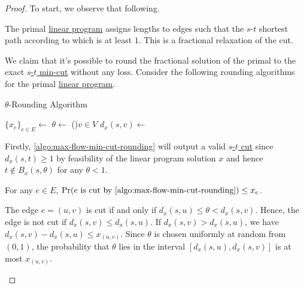 \begin{proof}
	To start, we observe that following.
	\begin{intuition}
		The primal \hyperref[eq:s-t-min-cut-LP]{linear program} assigns lengths to edges such that the \(s\)-\(t\) shortest path according to which is at least \(1\). This is a fractional relaxation of the cut.
	\end{intuition}

	We claim that it's possible to round the fractional solution of the primal to the exact \hyperref[prb:s-t-min-cut]{\(s\)-\(t\) min-cut} without any loss. Consider the following rounding algorithms for the primal \hyperref[eq:s-t-min-cut-LP]{linear program}.

	\begin{algorithm}[H]\label{algo:max-flow-min-cut-rounding}
		\DontPrintSemicolon{}
		\caption{\(\theta \)-Rounding Algorithm}

		\BlankLine

		\(\{ x_e \} _{e\in E} \gets\)
		\(\theta \gets\)\;
		\For(){\(v \in V\)}{
			\(d_x(s, v) \gets\)\;
		}
	\end{algorithm}

	Firstly, \autoref{algo:max-flow-min-cut-rounding} will output a valid \hyperref[prb:s-t-min-cut]{\(s\)-\(t\) cut} since \(d_x(s, t) \geq 1\) by feasibility of the linear program solution \(x\) and hence \(t \notin B_x(s, \theta )\) for any \(\theta < 1\).

	\begin{claim}
		For any \(e \in E\), \(\Pr(e \text{ is cut by \autoref{algo:max-flow-min-cut-rounding}} ) \leq x_e\).
	\end{claim}
	\begin{explanation}
		The edge \(e = (u, v)\) is cut if and only if \(d_x(s, u) \leq \theta < d_x(s, v)\). Hence, the edge is not cut if \(d_x(s, v) \leq d_x(s, u)\). If \(d_x(s, v) > d_x(s, u)\), we have \(d_x(s, v) - d_x(s, u) \leq x_{(u, v)}\). Since \(\theta \) is chosen uniformly at random from \((0, 1)\), the probability that \(\theta \) lies in the interval \([d_x(s, u), d_x(s, v)]\) is at most \(x_{(u, v)}\).
	\end{explanation}


\end{proof}
